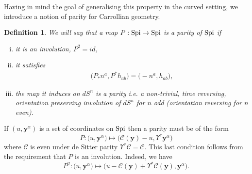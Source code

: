 \documentclass[a4paper, 10pt]{article}
\newtheorem{definition}{Definition}[section]
\theoremstyle{remark}
\newcommand{\Spi}{\textnormal{Spi}}
\newcommand{\y}{\bm{y}}
\begin{document}
Having in mind the goal of generalising this property in the curved setting, we introduce a notion of parity for Carrollian geometry.
\begin{definition}
    We will say that a map $P : \Spi \to \Spi$ is a parity of $\Spi$ if \begin{enumerate}[i)]\item it is an involution, $P^2 = id$, \item it satisfies
\begin{align*}
    \Big( P_* n^a, P^* h_{ab} \Big) =  \Big( -n^a, h_{ab} \Big),
\end{align*}
\item the map it induces on $dS^n$ is a parity i.e. a non-trivial, time reversing, orientation preserving involution of $dS^n$ for $n$ odd (orientation reversing for $n$ even). \end{enumerate} 
\end{definition}
If $(u,\y^{\alpha})$ is a set of coordinates on $\Spi$ then a parity must be of the form
\begin{equation}\label{Carrollian connection: parity on Spi}
 P:   \Big( u, \y^{\alpha}\Big) \mapsto \Big( \mathcal{C}(\y) -u, \Upsilon^* \y^{\alpha}\Big)
\end{equation}
where $\mathcal{C}$ is even under de Sitter  parity $\Upsilon^* \mathcal{C} = \mathcal{C}$. This last condition follows from the requirement that $P$ is an involution. Indeed, we have
\begin{equation}
 P^2:   \Big( u, \y^{\alpha}\Big) \mapsto \Big( u - \mathcal{C}(\y) + \Upsilon^*\mathcal{C}(\y) , \y^{\alpha}\Big).
\end{equation}
\end{document}
